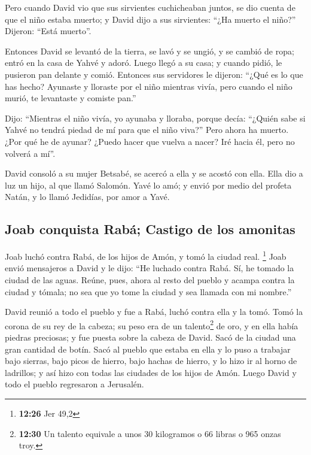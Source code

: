  Pero cuando David vio que sus sirvientes cuchicheaban
juntos, se dio cuenta de que el niño estaba muerto; y David dijo a sus
sirvientes: ``¿Ha muerto el niño?'' Dijeron: ``Está muerto''.

 Entonces David se levantó de la tierra, se lavó y se
ungió, y se cambió de ropa; entró en la casa de Yahvé y adoró. Luego
llegó a su casa; y cuando pidió, le pusieron pan delante y comió.
 Entonces sus servidores le dijeron: ``¿Qué es lo que has
hecho? Ayunaste y lloraste por el niño mientras vivía, pero cuando el
niño murió, te levantaste y comiste pan.''

 Dijo: ``Mientras el niño vivía, yo ayunaba y lloraba,
porque decía: ``¿Quién sabe si Yahvé no tendrá piedad de mí para que el
niño viva?''  Pero ahora ha muerto. ¿Por qué he de
ayunar? ¿Puedo hacer que vuelva a nacer? Iré hacia él, pero no volverá a
mí''.

 David consoló a su mujer Betsabé, se acercó a ella y se
acostó con ella. Ella dio a luz un hijo, al que llamó Salomón. Yavé lo
amó;  y envió por medio del profeta Natán, y lo llamó
Jedidías, por amor a Yavé.

\hypertarget{joab-conquista-rabuxe1-castigo-de-los-amonitas}{%
\subsection{Joab conquista Rabá; Castigo de los
amonitas}\label{joab-conquista-rabuxe1-castigo-de-los-amonitas}}

 Joab luchó contra Rabá, de los hijos de Amón, y tomó la
ciudad real. \footnote{\textbf{12:26} Jer 49,2}  Joab
envió mensajeros a David y le dijo: ``He luchado contra Rabá. Sí, he
tomado la ciudad de las aguas.  Reúne, pues, ahora al
resto del pueblo y acampa contra la ciudad y tómala; no sea que yo tome
la ciudad y sea llamada con mi nombre.''

 David reunió a todo el pueblo y fue a Rabá, luchó contra
ella y la tomó.  Tomó la corona de su rey de la cabeza;
su peso era de un talento\footnote{\textbf{12:30} Un talento equivale a
  unos 30 kilogramos o 66 libras o 965 onzas troy.} de oro, y en ella
había piedras preciosas; y fue puesta sobre la cabeza de David. Sacó de
la ciudad una gran cantidad de botín.  Sacó al pueblo que
estaba en ella y lo puso a trabajar bajo sierras, bajo picos de hierro,
bajo hachas de hierro, y lo hizo ir al horno de ladrillos; y así hizo
con todas las ciudades de los hijos de Amón. Luego David y todo el
pueblo regresaron a Jerusalén.

